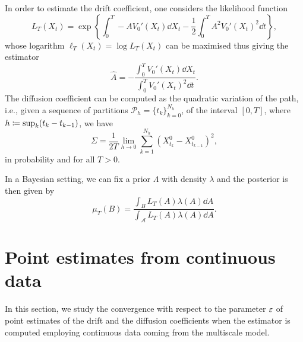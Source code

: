 \documentclass[10pt]{article}
\begin{document}
In order to estimate the drift coefficient, one considers the likelihood function
\begin{equation}
	L_T(X_t) = \exp\left\{\int_0^T -A V_0'(X_t) \dd X_t - \frac12 \int_0^T A^2 V_0'(X_t)^2 \dd t \right\},
\end{equation}
whose logarithm $\ell_T(X_t) = \log L_T(X_t)$ can be maximised thus giving the estimator
\begin{equation}\label{eq:AEst}
	\widehat A = - \frac{\int_0^T V_0'(X_t) \dd X_t}{\int_0^T V_0'(X_t)^2 \dd t}.
\end{equation}
The diffusion coefficient can be computed as the quadratic variation of the path, i.e., given a sequence of partitions $\mathcal P_h = \{t_{k}\}_{k=0}^{N_h}$, of the interval $[0, T]$, where $h \coloneqq \sup_k (t_k - t_{k-1})$, we have
\begin{equation}\label{eq:SigmaEst}
	\Sigma = \frac1{2T} \lim_{h\to 0} \sum_{k=1}^{N_h} (X^0_{t_k} - X^0_{t_{k-1}})^2,
\end{equation}
in probability and for all $T > 0$.

In a Bayesian setting, we can fix a prior $\Lambda$ with density $\lambda$ and the posterior is then given by
\begin{equation}
	\mu_T(B) = \frac{\int_B L_T(A) \lambda(A) \dd A}{\int_{\mathcal A} L_T(A) \lambda(A) \dd A}.
\end{equation}

\section{Point estimates from continuous data}

In this section, we study the convergence with respect to the parameter $\varepsilon$ of point estimates of the drift and the diffusion coefficients when the estimator is computed employing continuous data coming from the multiscale model.
\end{document}
